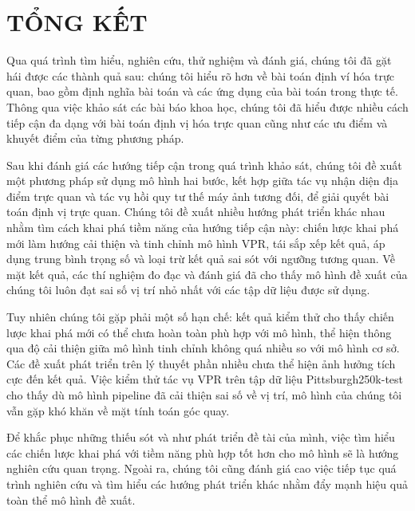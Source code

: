 \chapter{TỔNG KẾT}

Qua quá trình tìm hiểu, nghiên cứu, thử nghiệm và đánh giá, chúng tôi đã gặt hái được các thành quả sau: chúng tôi hiểu rõ hơn về bài toán định ví hóa trực quan, bao gồm định nghĩa bài toán và các ứng dụng của bài toán trong thực tế. Thông qua việc khảo sát các bài báo khoa học, chúng tôi đã hiểu được nhiều cách tiếp cận đa dạng với bài toán định vị hóa trực quan cũng như các ưu điểm và khuyết điểm của từng phương pháp.

Sau khi đánh giá các hướng tiếp cận trong quá trình khảo sát, chúng tôi đề xuất một phương pháp sử dụng mô hình hai bước, kết hợp giữa tác vụ nhận diện địa điểm trực quan và tác vụ hồi quy tư thế máy ảnh tương đối, để giải quyết bài toán định vị trực quan. Chúng tôi đề xuất nhiều hướng phát triển khác nhau nhằm tìm cách khai phá tiềm năng của hướng tiếp cận này: chiến lược khai phá mới làm hướng cải thiện và tinh chỉnh mô hình VPR, tái sắp xếp kết quả, áp dụng trung bình trọng số và loại trừ kết quả sai sót với ngưỡng tương quan. Về mặt kết quả, các thí nghiệm đo đạc và đánh giá đã cho thấy mô hình đề xuất của chúng tôi luôn đạt sai số vị trí nhỏ nhất với các tập dữ liệu được sử dụng.

Tuy nhiên chúng tôi gặp phải một số hạn chế: kết quả kiểm thử cho thấy chiến lược khai phá mới có thể chưa hoàn toàn phù hợp với mô hình, thể hiện thông qua độ cải thiện giữa mô hình tinh chỉnh không quá nhiều so với mô hình cơ sở. Các đề xuất phát triển trên lý thuyết phần nhiều chưa thể hiện ảnh hưởng tích cực đến kết quả. Việc kiểm thử tác vụ VPR trên tập dữ liệu Pittsburgh250k-test cho thấy dù mô hình pipeline đã cải thiện sai số về vị trí, mô hình của chúng tôi vẫn gặp khó khăn về mặt tính toán góc quay.

Để khắc phục những thiếu sót và như phát triển đề tài của mình, việc tìm hiểu các chiến lược khai phá với tiềm năng phù hợp tốt hơn cho mô hình sẽ là hướng nghiên cứu quan trọng. Ngoài ra, chúng tôi cũng đánh giá cao việc tiếp tục quá trình nghiên cứu và tìm hiểu các hướng phát triển khác nhằm đẩy mạnh hiệu quả toàn thể mô hình đề xuất.
